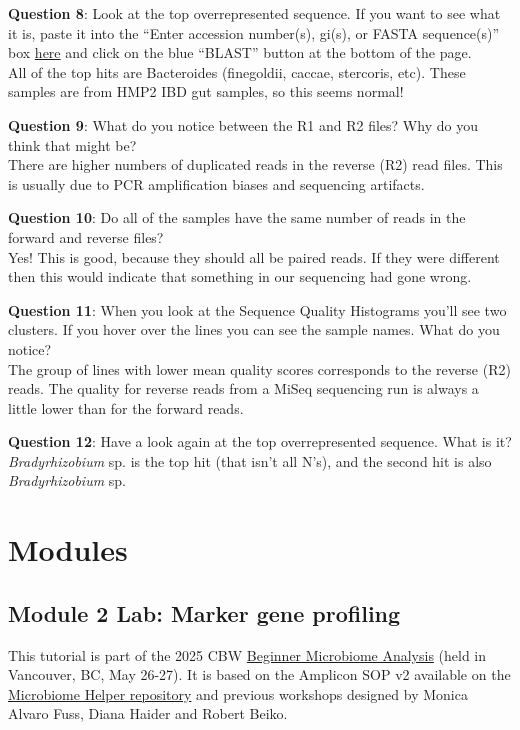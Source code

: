 \documentclass[
]{book}
\begin{document}
\textbf{Question 8}: Look at the top overrepresented sequence. If you want to see what it is, paste it into the ``Enter accession number(s), gi(s), or FASTA sequence(s)'' box \href{https://blast.ncbi.nlm.nih.gov/Blast.cgi?PROGRAM=blastn&PAGE_TYPE=BlastSearch&LINK_LOC=blasthome}{here} and click on the blue ``BLAST'' button at the bottom of the page.\\
All of the top hits are Bacteroides (finegoldii, caccae, stercoris, etc). These samples are from HMP2 IBD gut samples, so this seems normal!

\textbf{Question 9}: What do you notice between the R1 and R2 files? Why do you think that might be?\\
There are higher numbers of duplicated reads in the reverse (R2) read files. This is usually due to PCR amplification biases and sequencing artifacts.

\textbf{Question 10}: Do all of the samples have the same number of reads in the forward and reverse files?\\
Yes! This is good, because they should all be paired reads. If they were different then this would indicate that something in our sequencing had gone wrong.

\textbf{Question 11}: When you look at the Sequence Quality Histograms you'll see two clusters. If you hover over the lines you can see the sample names. What do you notice?\\
The group of lines with lower mean quality scores corresponds to the reverse (R2) reads. The quality for reverse reads from a MiSeq sequencing run is always a little lower than for the forward reads.

\textbf{Question 12}: Have a look again at the top overrepresented sequence. What is it?\\
\emph{Bradyrhizobium} sp. is the top hit (that isn't all N's), and the second hit is also \emph{Bradyrhizobium} sp.

\part{Modules}\label{part-modules-1}

\chapter{Module 2 Lab: Marker gene profiling}\label{module-2-lab-marker-gene-profiling}

This tutorial is part of the 2025 CBW \href{https://bioinformaticsdotca.github.io/BMB_2025/}{Beginner Microbiome Analysis} (held in Vancouver, BC, May 26-27). It is based on the Amplicon SOP v2 available on the \href{https://github.com/LangilleLab/microbiome_helper/wiki/Amplicon-SOP-v2-(qiime2\%E2\%80\%902024.5)}{Microbiome Helper repository} and previous workshops designed by Monica Alvaro Fuss, Diana Haider and Robert Beiko.
\end{document}
